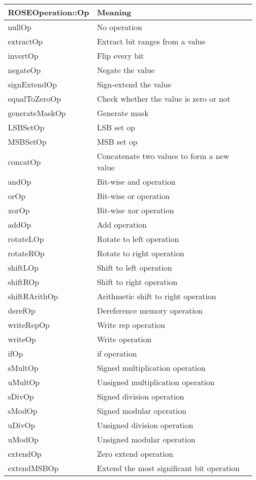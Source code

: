 \begin{center}
\begin{tabular}{ll}
\toprule
ROSEOperation::Op & Meaning \\
\midrule
    nullOp  & No operation \\
    extractOp & Extract bit ranges from a value \\
    invertOp & Flip every bit \\
    negateOp & Negate the value \\
    signExtendOp & Sign-extend the value \\
    equalToZeroOp & Check whether the value is zero or not \\
    generateMaskOp & Generate mask \\
    LSBSetOp & LSB set op\\
    MSBSetOp & MSB set op \\
    concatOp & Concatenate two values to form a new value \\
    andOp & Bit-wise and operation \\
    orOp & Bit-wise or operation \\
    xorOp & Bit-wise xor operation \\
    addOp & Add operation \\
    rotateLOp & Rotate to left operation \\
    rotateROp & Rotate to right operation \\
    shiftLOp & Shift to left operation \\
    shiftROp & Shift to right operation \\
    shiftRArithOp & Arithmetic shift to right operation \\
    derefOp  & Dereference memory operation \\
    writeRepOp & Write rep operation\\
    writeOp & Write operation\\
    ifOp & if operation \\
    sMultOp & Signed multiplication operation \\
    uMultOp & Unsigned multiplication operation \\
    sDivOp & Signed division operation \\
    sModOp & Signed modular operation \\
    uDivOp & Unsigned division operation \\    
    uModOp & Unsigned modular operation \\
    extendOp & Zero extend operation \\
    extendMSBOp & Extend the most significant bit operation \\
\bottomrule
\end{tabular}
\end{center}

